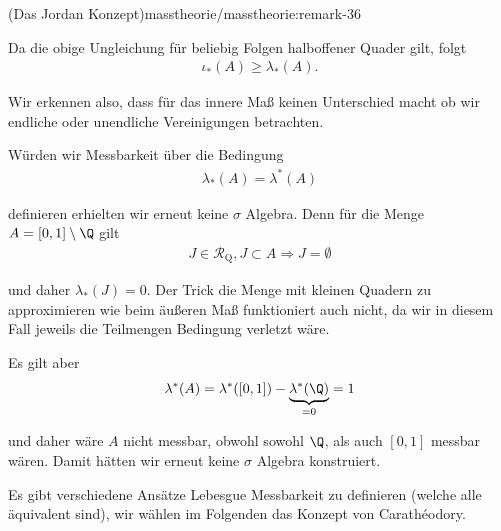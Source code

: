 \documentclass[letterpaper,10pt,german]{jupyterBook}
\begin{document}
\begin{remark}{(Das Jordan Konzept)}{masstheorie/masstheorie:remark-36}
\par
Da die obige Ungleichung für beliebig Folgen halboffener Quader gilt, folgt
\begin{align*}
\iota_\ast(A) \geq \lambda_\ast(A).
\end{align*}
\par
Wir erkennen also, dass für das innere Maß keinen Unterschied macht ob wir endliche oder unendliche Vereinigungen betrachten.

\par
Würden wir Messbarkeit über die Bedingung
\begin{align*}
\lambda_\ast(A)=\lambda^\ast(A)
\end{align*}
\par
definieren erhielten wir erneut keine \(\sigma\) Algebra. Denn für die Menge \(A=[0,1]\setminus\Q\) gilt
\begin{align*}
J\in\mathcal{R}_{\text{Q}}, J\subset A\Rightarrow J=\emptyset
\end{align*}
\par
und daher \(\lambda_\ast(J) = 0\). Der Trick die Menge mit kleinen Quadern zu approximieren wie beim äußeren Maß funktioniert auch nicht, da wir in diesem Fall jeweils die Teilmengen Bedingung verletzt wäre.

\par
Es gilt aber
\begin{align*}
\lambda^\ast(A) = \lambda^\ast([0,1]) - \underbrace{\lambda^\ast(\Q)}_{=0} = 1
\end{align*}
\par
und daher wäre \(A\) nicht messbar, obwohl sowohl \(\Q\), als auch \([0,1]\) messbar wären. Damit hätten wir erneut keine \(\sigma\) Algebra konstruiert.
\end{remark}

\par
Es gibt verschiedene Ansätze Lebesgue Messbarkeit zu definieren (welche alle äquivalent sind), wir wählen im Folgenden das Konzept von
Carathéodory.
\end{document}
